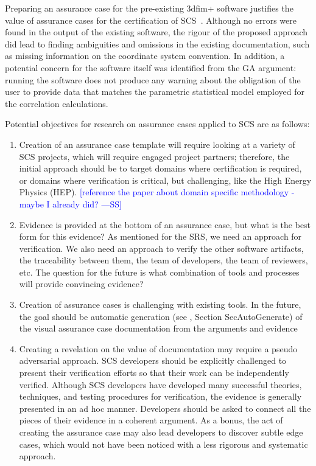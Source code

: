 \documentclass[final, 3p, times, authoryear]{elsarticle}
\newcommand{\authornote}[3]{\textcolor{#1}{[#3 ---#2]}}
\newcommand{\authornote}[3]{}
\newcommand{\wss}[1]{\authornote{blue}{SS}{#1}} %
\begin{document}
Preparing an assurance case for the pre-existing 3dfim+ software justifies the
value of assurance cases for the certification of SCS~\cite{SmithEtAl2018}.
Although no errors were found in the output of the existing software, the rigour
of the proposed approach did lead to finding ambiguities and omissions in the
existing documentation, such as missing information on the coordinate system
convention.  In addition, a potential concern for the software itself was
identified from the GA argument: running the software does not produce any
warning about the obligation of the user to provide data that matches the
parametric statistical model employed for the correlation calculations.

Potential objectives for research on assurance cases applied to SCS are as
follows:

\begin{enumerate}
\item Creation of an assurance case template will require looking at a variety
  of SCS projects, which will require engaged project partners; therefore, the
  initial approach should be to target domains where certification is required,
  or domains where verification is critical, but challenging, like the High
  Energy Physics (HEP). \wss{reference the paper about domain specific
  methodology - maybe I already did?}
\item Evidence is provided at the bottom of an assurance case, but what is
  the best form for this evidence?  As mentioned for the SRS, we need an
  approach for verification.  We also need an approach to verify the other
  software artifacts, the traceability between them, the team of developers, the
  team of reviewers, etc.  The question for the future is what combination of
  tools and processes will provide convincing evidence?
\item Creation of assurance cases is challenging with existing tools.  In the
  future, the goal should be automatic generation (see
  \citet{Smith2018}, Section SecAutoGenerate) of the visual assurance case documentation from
  the arguments and evidence
\item Creating a revelation on the value of documentation \citep{Smith2018} may
   require a pseudo adversarial approach.  SCS developers should be explicitly
   challenged to present their verification efforts so that their work can be
   independently verified.  Although SCS developers have developed many
   successful theories, techniques, and testing procedures for verification, the
   evidence is generally presented in an ad hoc manner.  Developers should be
   asked to connect all the pieces of their evidence in a coherent argument.  As
   a bonus, the act of creating the assurance case may also lead developers to
   discover subtle edge cases, which would not have been noticed with a less
   rigorous and systematic approach.

\end{enumerate}
\end{document}
